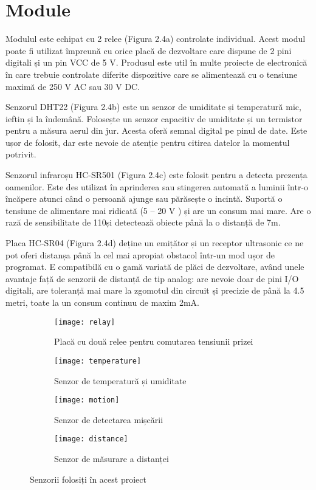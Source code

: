 \break

\section{Module} 

Modulul este echipat cu 2 relee (Figura 2.4a) controlate individual. Acest modul poate fi utilizat împreună cu orice placă de dezvoltare care dispune de 2 pini digitali și un pin VCC de 5 V. Produsul este util în multe proiecte de electronică în care trebuie controlate diferite dispozitive care se alimentează cu o tensiune maximă de 250 V AC sau 30 V DC.

Senzorul DHT22 (Figura 2.4b) este un senzor de umiditate și temperatură mic, ieftin și la îndemână. Folosește un senzor capacitiv de umiditate și un termistor pentru a măsura aerul din jur. Acesta oferă semnal digital pe pinul de date. Este ușor de folosit, dar este nevoie de atenție pentru citirea datelor la momentul potrivit.

Senzorul infraroșu HC-SR501 (Figura 2.4c) este folosit pentru a detecta prezența oamenilor. Este des utilizat în aprinderea sau stingerea automată a luminii într-o încăpere atunci când o persoană ajunge sau părăsește o incintă. Suportă o tensiune de alimentare mai ridicată (5 – 20 V ) și are un consum mai mare. Are o rază de sensibilitate de 110\textdegree și detectează obiecte până la o distanță de 7m.

Placa HC-SR04 (Figura 2.4d) deține un emițător și un receptor ultrasonic ce ne pot oferi distanșa până la cel mai apropiat obstacol într-un mod ușor de programat. E compatibilă cu o gamă variată de plăci de dezvoltare, având unele avantaje față de senzorii de distanță de tip analog: are nevoie doar de pini I/O digitali, are toleranță mai mare la zgomotul din circuit și precizie de până la 4.5 metri, toate la un consum continuu de maxim 2mA.

\begin{figure}[h]
	\centering
	\begin{subfigure}{0.45\textwidth}
		\texttt{[image: relay]}
		\caption{Placă cu două relee pentru comutarea tensiunii prizei}
		\label{fig:relay}
	\end{subfigure}
	\hfill
	\begin{subfigure}{0.45\textwidth}
		\texttt{[image: temperature]}
		\caption{Senzor de temperatură și umiditate}
		\label{fig:temperature}
	\end{subfigure}
	\begin{subfigure}{0.45\textwidth}
		\texttt{[image: motion]}
		\caption{Senzor de detectarea mișcării}
		\label{fig:motion}
	\end{subfigure}
	\hfill
		\begin{subfigure}{0.45\textwidth}
		\texttt{[image: distance]}
		\caption{Senzor de măsurare a distanței}
		\label{fig:distance}
	\end{subfigure}
	\hfill
	\caption{Senzorii folosiți în acest proiect}
	\label{fig:all}
\end{figure}

